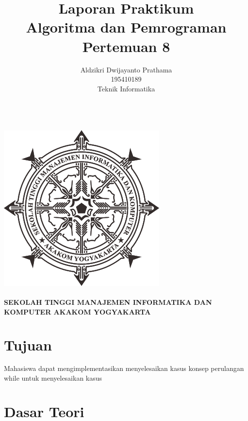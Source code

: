 \documentclass[a4paper,12pt]{article}
\begin{document}
\title{ {\Large Laporan Praktikum}\\ Algoritma dan Pemrograman \\{\Large Pertemuan 8}}

\author{Aldzikri Dwijayanto Prathama 
	\\195410189
	\\Teknik Informatika}
\makeatletter
\begin{titlepage}
	\begin{center}
		{\huge \bfseries \@title }\\[14ex]
		\includegraphics[scale=.8]{logo}\\[4ex]
		{\large \@author}\\[19ex]
		{\large \bfseries {SEKOLAH TINGGI MANAJEMEN INFORMATIKA DAN KOMPUTER
				AKAKOM YOGYAKARTA}}
	\end{center}


\end{titlepage}
\makeatother
\newpage
\tableofcontents
\newpage

\section{Tujuan}
Mahasiswa dapat mengimplementasikan menyelesaikan kasus konsep perulangan while untuk menyelesaikan kasus
\section{Dasar Teori}
\end{document}
